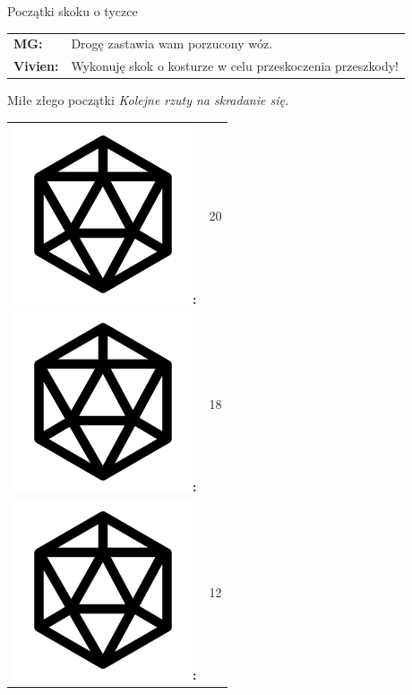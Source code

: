 \documentclass[10pt,twoside,twocolumn]{book}
\begin{document}
\begin{rpg-quotebox}{Początki skoku o tyczce}
   \begin{tabularx}{\columnwidth}{lX}
      \textbf{MG:} & Drogę zastawia wam porzucony wóz.\\
      \textbf{Vivien:} & Wykonuję skok o kosturze w celu przeskoczenia przeszkody!\\
   \end{tabularx}
\end{rpg-quotebox}

\begin{rpg-quotebox}{Miłe złego początki}
   \textit{Kolejne rzuty na skradanie się.}\\

   \begin{tabularx}{\columnwidth}{lX}
      \includegraphics[scale=0.06]{img/d20.png}\textbf{:}& 20\\
      \includegraphics[scale=0.06]{img/d20.png}\textbf{:}& 18\\
      \includegraphics[scale=0.06]{img/d20.png}\textbf{:}& 12\\

\end{tabularx}
\end{rpg-quotebox}
\end{document}
